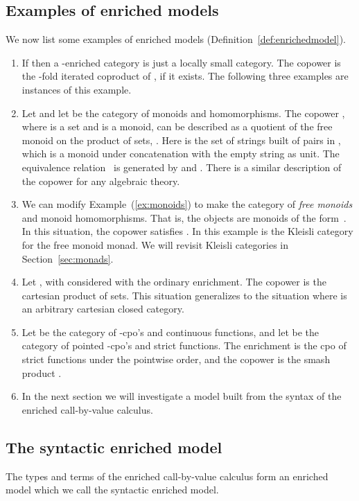 \documentclass{LMCS}
\begin{document}
\subsection{Examples of enriched models}
\label{sec:examplesenriched}
We now list some examples of enriched models (Definition~\ref{def:enrichedmodel}).
\begin{enumerate}
\item If  then a -enriched category 
is just a locally small category.
The copower  is the -fold 
iterated coproduct of , if it exists.
The following three examples are instances of this example.
\item \label{ex:monoids}Let  and let  be 
the category of monoids and homomorphisms.
The copower , where  is a set and  is a monoid,
can be described as a quotient of the free monoid on the product of sets,
.
Here  is the 
set of strings built of pairs in ,
which is a monoid under concatenation
with the empty string  as unit.
The equivalence relation~ is generated by
 and .
There is a similar description of the copower for any algebraic theory.
\item
We can modify Example~(\ref{ex:monoids}) 
to make  the category of 
\emph{free monoids} and monoid homomorphisms.
That is, the objects are monoids of the form~.
In this situation, the copower satisfies 
.
In this example  is the Kleisli category 
for the free monoid monad. We will revisit Kleisli categories in 
Section~\ref{sec:monads}.
\item Let ,
with  considered with the ordinary enrichment.
The copower  is the cartesian product of sets.
This situation generalizes to the situation where  is an arbitrary
cartesian closed category.
\item Let  be the category of -cpo's and continuous functions, 
and let  be the category of pointed -cpo's and strict functions.
The enrichment  is the cpo of strict functions under
the pointwise order, and the copower  is the smash product
.
\item In the next section we will investigate a model
built from the syntax of the enriched 
call-by-value calculus.
\end{enumerate}


\subsection{The syntactic enriched model}
\label{sec:syn:enr:model}

The types and terms of the enriched call-by-value 
calculus form an enriched model
which we call the syntactic enriched model. 
\end{document}
